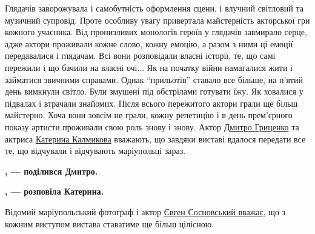 Глядачів заворожувала і самобутність оформлення сцени, і влучний світловий та
музичний супровід. Проте особливу увагу привертала майстерність акторської гри
кожного учасника. Від пронизливих монологів героїв у глядачів завмирало серце,
адже актори проживали кожне слово, кожну емоцію, а разом з ними ці емоції
передавалися і глядачам. Всі вони розповідали власні історії, те, що самі
пережили і що бачили на власні очі... Як на початку війни намагалися жити і
займатися звичними справами. Однак \enquote{прильотів} ставало все більше, на п'ятий
день вимкнули світло. Були змушені під обстрілами готувати їжу. Як ховалися у
підвалах і втрачали знайомих. Після всього пережитого актори грали ще більш
майстерно. Хоча вони зовсім не грали, кожну репетицію і в день прем'єрного
показу артисти проживали свою роль знову і знову. Актор \href{https://www.facebook.com/MrEvangelion}{Дмитро Гриценко} та
актриса \href{https://www.facebook.com/profile.php?id=100001570485517}{Катерина Калмикова} вважають, що завдяки виставі вдалося передати все
те, що відчували і відчувають маріупольці зараз.

\begin{leftbar}
	\begingroup
		\bfseries
{}, — поділився Дмитро.
	\endgroup
\end{leftbar}

\begin{leftbar}
	\begingroup
		\bfseries
{}, — розповіла Катерина.
	\endgroup
\end{leftbar}


Відомий маріупольський фотограф і актор \href{https://www.facebook.com/evgeny.sosnovsky}{Євген Сосновський вважає}, що з кожним
виступом вистава ставатиме ще більш цілісною. 

